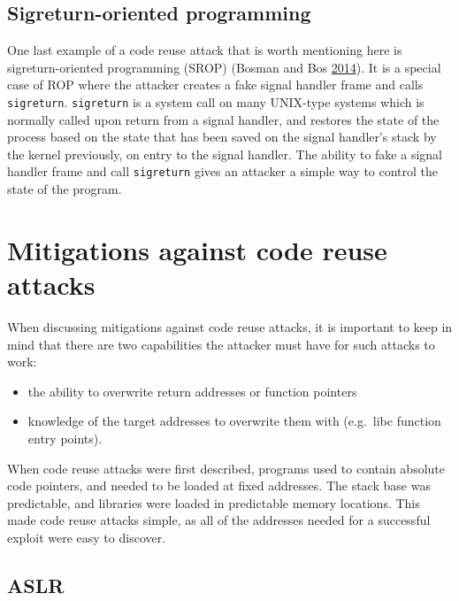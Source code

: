 \documentclass[a4paper,]{report}
\providecommand{\tightlist}{%
  \setlength{\itemsep}{0pt}\setlength{\parskip}{0pt}}
\begin{document}
\hypertarget{sigreturn-oriented-programming}{%
\subsection{Sigreturn-oriented
programming}\label{sigreturn-oriented-programming}}

One last example of a code reuse attack that is worth mentioning here is
sigreturn-oriented programming
(SROP) (Bosman and Bos \protect\hyperlink{ref-Bosman2014}{2014}). It is
a special case of ROP where the attacker creates a fake signal handler
frame and calls \texttt{sigreturn}. \texttt{sigreturn} is a system call
on many UNIX-type systems which is normally called upon return from a
signal handler, and restores the state of the process based on the state
that has been saved on the signal handler's stack by the kernel
previously, on entry to the signal handler. The ability to fake a signal
handler frame and call \texttt{sigreturn} gives an attacker a simple way
to control the state of the program.

\hypertarget{mitigations-against-code-reuse-attacks}{%
\section{Mitigations against code reuse
attacks}\label{mitigations-against-code-reuse-attacks}}

When discussing mitigations against code reuse attacks, it is important
to keep in mind that there are two capabilities the attacker must have
for such attacks to work:

\begin{itemize}
\tightlist
\item
  the ability to overwrite return addresses or function pointers
\item
  knowledge of the target addresses to overwrite them with (e.g.~libc
  function entry points).
\end{itemize}

When code reuse attacks were first described, programs used to contain
absolute code pointers, and needed to be loaded at fixed addresses. The
stack base was predictable, and libraries were loaded in predictable
memory locations. This made code reuse attacks simple, as all of the
addresses needed for a successful exploit were easy to discover.

\hypertarget{aslr}{%
\subsection{ASLR}\label{aslr}}
\end{document}
